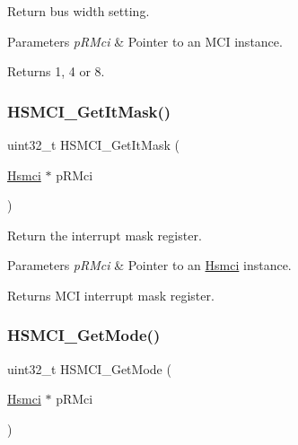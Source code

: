 Return bus width setting. 


\begin{DoxyParams}{Parameters}
{\em p\+R\+Mci} & Pointer to an M\+CI instance. \\
\hline
\end{DoxyParams}
\begin{DoxyReturn}{Returns}
1, 4 or 8. 
\end{DoxyReturn}
\mbox{\label{group__hsmci__functions_gae4fc955f147a6f1fa8d8c511e7f9f4f6}} 
\subsubsection{\texorpdfstring{HSMCI\_GetItMask()}{HSMCI\_GetItMask()}}
{\footnotesize\ttfamily uint32\+\_\+t H\+S\+M\+C\+I\+\_\+\+Get\+It\+Mask (\begin{DoxyParamCaption}\item[{\mbox{\hyperlink{structHsmci}{Hsmci}} $\ast$}]{p\+R\+Mci }\end{DoxyParamCaption})}



Return the interrupt mask register. 


\begin{DoxyParams}{Parameters}
{\em p\+R\+Mci} & Pointer to an \mbox{\hyperlink{structHsmci}{Hsmci}} instance. \\
\hline
\end{DoxyParams}
\begin{DoxyReturn}{Returns}
M\+CI interrupt mask register. 
\end{DoxyReturn}
\mbox{\label{group__hsmci__functions_ga016a1f6f3a075807c55a2ad2cf23255a}} 
\subsubsection{\texorpdfstring{HSMCI\_GetMode()}{HSMCI\_GetMode()}}
{\footnotesize\ttfamily uint32\+\_\+t H\+S\+M\+C\+I\+\_\+\+Get\+Mode (\begin{DoxyParamCaption}\item[{\mbox{\hyperlink{structHsmci}{Hsmci}} $\ast$}]{p\+R\+Mci }\end{DoxyParamCaption})}



